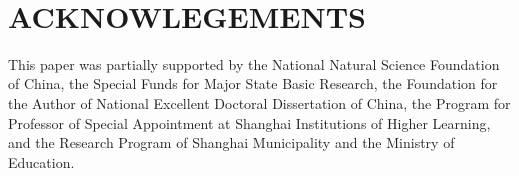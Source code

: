 \documentclass[%
 reprint,
 amsmath,amssymb,
 aps,
 prb,
]{revtex4-1}
\begin{document}
\quad \\
\section{ACKNOWLEGEMENTS}
This paper was partially supported by the National Natural Science Foundation of China, the Special Funds for Major State Basic Research, the Foundation for the Author of National Excellent Doctoral Dissertation of China, the Program for Professor of Special Appointment at Shanghai Institutions of Higher Learning, and the Research Program of Shanghai Municipality and the Ministry of Education.



\end{document}
